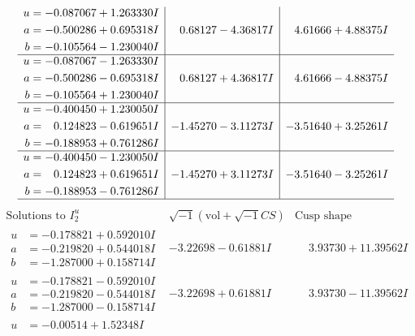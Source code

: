 \documentclass[1p]{elsarticle_modified}
\theoremstyle{definition}
\newcommand{\I}{\sqrt{-1}}
\begin{document}
$$\begin{array}{c|c|c}
\begin{aligned}
u &= -0.087067 + 1.263330 I \\
a &= -0.500286 + 0.695318 I \\
b &= -0.105564 - 1.230040 I\end{aligned}
 & \phantom{-}0.68127 - 4.36817 I & \phantom{-}4.61666 + 4.88375 I \\ \hline\begin{aligned}
u &= -0.087067 - 1.263330 I \\
a &= -0.500286 - 0.695318 I \\
b &= -0.105564 + 1.230040 I\end{aligned}
 & \phantom{-}0.68127 + 4.36817 I & \phantom{-}4.61666 - 4.88375 I \\ \hline\begin{aligned}
u &= -0.400450 + 1.230050 I \\
a &= \phantom{-}0.124823 - 0.619651 I \\
b &= -0.188953 + 0.761286 I\end{aligned}
 & -1.45270 - 3.11273 I & -3.51640 + 3.25261 I \\ \hline\begin{aligned}
u &= -0.400450 - 1.230050 I \\
a &= \phantom{-}0.124823 + 0.619651 I \\
b &= -0.188953 - 0.761286 I\end{aligned}
 & -1.45270 + 3.11273 I & -3.51640 - 3.25261 I\\
 \hline 
 \end{array}$$\newpage$$\begin{array}{c|c|c}  
\text{Solutions to }I^u_{2}& \I (\text{vol} + \sqrt{-1}CS) & \text{Cusp shape}\\
 \hline 
\begin{aligned}
u &= -0.178821 + 0.592010 I \\
a &= -0.219820 + 0.544018 I \\
b &= -1.287000 + 0.158714 I\end{aligned}
 & -3.22698 - 0.61881 I & \phantom{-}3.93730 + 11.39562 I \\ \hline\begin{aligned}
u &= -0.178821 - 0.592010 I \\
a &= -0.219820 - 0.544018 I \\
b &= -1.287000 - 0.158714 I\end{aligned}
 & -3.22698 + 0.61881 I & \phantom{-}3.93730 - 11.39562 I \\ \hline\begin{aligned}
u &= -0.00514 + 1.52348 I \\

\end{aligned}
\end{array}$$
\end{document}
